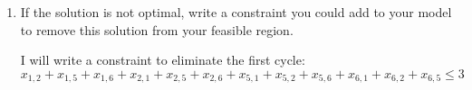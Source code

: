 \documentclass[11pt]{article}
\theoremstyle{definition}
\newcommand{\blu}{\color{blue}}
\begin{document}
\begin{enumerate}
\begin{enumerate}
{	\blu
	No this is not the optimal solution. It consists of two cycles $1-2-5-6-1$ and $3-7-8-4-3$
	}
	\item If the solution is not optimal, write a constraint you could add to your model to remove this solution from your feasible region.
	{
	\blu
	
	I will write a constraint to eliminate the first cycle:
	\[
	x_{1,2}+x_{1,5}+x_{1,6} + x_{2,1}+x_{2,5}+x_{2,6} + x_{5,1}+x_{5,2}+x_{5,6} + x_{6,1}+x_{6,2}+x_{6,5} \leq 3
	\]
	}
	\end{enumerate}
\end{enumerate}
\end{document}
